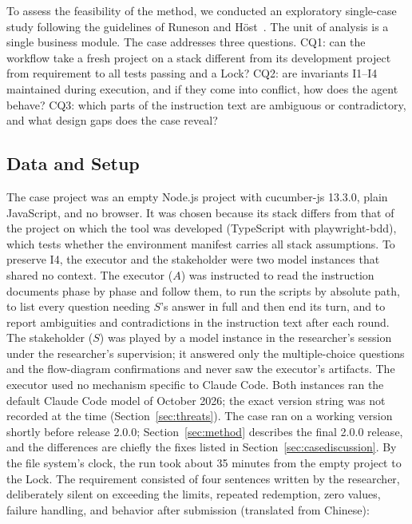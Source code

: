 \documentclass[conference]{IEEEtran}
\begin{document}
To assess the feasibility of the method, we conducted an exploratory single-case study following the guidelines of Runeson and H\"ost~\cite{runeson2009case}. The unit of analysis is a single business module. The case addresses three questions. CQ1: can the workflow take a fresh project on a stack different from its development project from requirement to all tests passing and a Lock? CQ2: are invariants I1--I4 maintained during execution, and if they come into conflict, how does the agent behave? CQ3: which parts of the instruction text are ambiguous or contradictory, and what design gaps does the case reveal?

\subsection{Data and Setup}

The case project was an empty Node.js project with cucumber-js 13.3.0, plain JavaScript, and no browser. It was chosen because its stack differs from that of the project on which the tool was developed (TypeScript with playwright-bdd), which tests whether the environment manifest carries all stack assumptions. To preserve I4, the executor and the stakeholder were two model instances that shared no context. The executor ($A$) was instructed to read the instruction documents phase by phase and follow them, to run the scripts by absolute path, to list every question needing $S$'s answer in full and then end its turn, and to report ambiguities and contradictions in the instruction text after each round. The stakeholder ($S$) was played by a model instance in the researcher's session under the researcher's supervision; it answered only the multiple-choice questions and the flow-diagram confirmations and never saw the executor's artifacts. The executor used no mechanism specific to Claude Code. Both instances ran the default Claude Code model of October 2026; the exact version string was not recorded at the time (Section~\ref{sec:threats}). The case ran on a working version shortly before release 2.0.0; Section~\ref{sec:method} describes the final 2.0.0 release, and the differences are chiefly the fixes listed in Section~\ref{sec:casediscussion}. By the file system's clock, the run took about 35 minutes from the empty project to the Lock. The requirement consisted of four sentences written by the researcher, deliberately silent on exceeding the limits, repeated redemption, zero values, failure handling, and behavior after submission (translated from Chinese):
\end{document}
